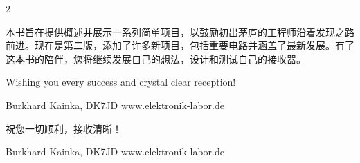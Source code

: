 \documentclass{ctexbook}
\begin{document}
\begin{paracol}{2}
\switchcolumn

本书旨在提供概述并展示一系列简单项目，以鼓励初出茅庐的工程师沿着发现之路前进。现在是第二版，添加了许多新项目，包括重要电路并涵盖了最新发展。有了这本书的陪伴，您将继续发展自己的想法，设计和测试自己的接收器。

\switchcolumn*

Wishing you every success and crystal clear reception! 

Burkhard Kainka, DK7JD 
www.elektronik-labor.de

\switchcolumn

祝您一切顺利，接收清晰！

Burkhard Kainka, DK7JD
www.elektronik-labor.de

\end{paracol}

\tableofcontents

\mainmatter
\end{document}
